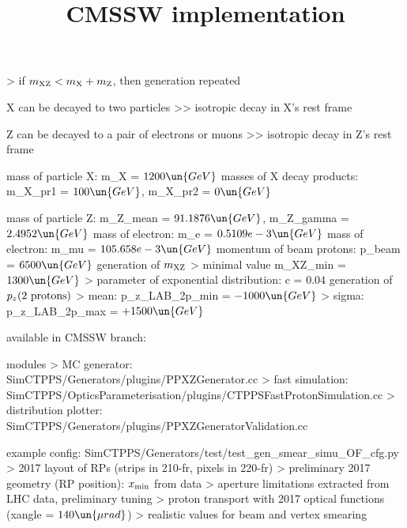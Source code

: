 \>> if $m_{\rm XZ} < m_{\rm X} + m_{\rm Z}$, then generation repeated

\> X can be decayed to two particles
\>>> isotropic decay in X's rest frame

\> Z can be decayed to a pair of electrons or muons
\>>> isotropic decay in Z's rest frame


\newpage %

\> mass of particle X: m\_X = $1200\un{GeV}$
\> masses of X decay products: m\_X\_pr1 = $100\un{GeV}$, m\_X\_pr2 = $0\un{GeV}$

\> mass of particle Z: m\_Z\_mean = $91.1876\un{GeV}$, m\_Z\_gamma = $2.4952\un{GeV}$
\> mass of electron: m\_e = $0.5109e-3\un{GeV}$
\> mass of electron: m\_mu = $105.658e-3\un{GeV}$
\> momentum of beam protons: p\_beam = $6500\un{GeV}$
\> generation of $m_{\rm XZ}$
\>> minimal value m\_XZ\_min = $1300\un{GeV}$
\>> parameter of exponential distribution: c = $0.04$
\> generation of $p_z(\hbox{2 protons})$
\>> mean: p\_z\_LAB\_2p\_min = $-1000\un{GeV}$
\>> sigma: p\_z\_LAB\_2p\_max = $+1500\un{GeV}$


\newpage %
\title{CMSSW implementation}

\> available in CMSSW branch:\\ 

\NormalFonts

\> modules
\>> MC generator:\\ SimCTPPS/Generators/plugins/PPXZGenerator.cc
\>> fast simulation:\\ SimCTPPS/OpticsParameterisation/plugins/CTPPSFastProtonSimulation.cc
\>> distribution plotter:\\ SimCTPPS/Generators/plugins/PPXZGeneratorValidation.cc

\> example config: SimCTPPS/Generators/test/test\_gen\_smear\_simu\_OF\_cfg.py
\>> 2017 layout of RPs (strips in 210-fr, pixels in 220-fr)
\>> preliminary 2017 geometry (RP position): $x_{\rm min}$ from data
\>> aperture limitations extracted from LHC data, preliminary tuning
\>> proton transport with 2017 optical functions (xangle = $140\un{\mu rad}$)
\>> realistic values for beam and vertex smearing


